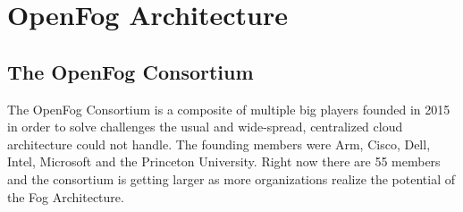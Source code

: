 \section{OpenFog Architecture}

\subsection{The OpenFog Consortium}

The OpenFog Consortium is a composite of multiple big players founded in 2015 in order to solve challenges the usual and wide-spread, centralized cloud architecture could not handle.
The founding members were Arm, Cisco, Dell, Intel, Microsoft and the Princeton University. Right now there are 55 members and the consortium is getting larger as more organizations realize the potential of the Fog Architecture.

